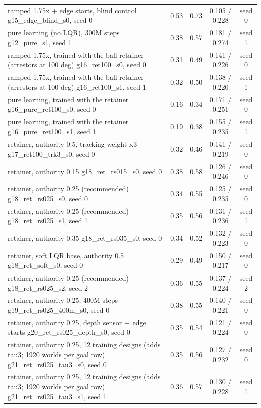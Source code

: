 \begin{table}[t]
{\begin{tabular}{lcccc}
ramped 1.75x + edge starts, blind control g15\_edge\_blind\_s0, seed 0 & 0.53 & 0.73 & 0.105 / 0.228 & seed 0\\
pure learning (no LQR), 300M steps g12\_pure\_s1, seed 1 & 0.38 & 0.57 & 0.181 / 0.274 & seed 1\\
ramped 1.75x, trained with the ball retainer (arrestors at 100 deg) g16\_ret100\_s0, seed 0 & 0.31 & 0.49 & 0.141 / 0.226 & seed 0\\
ramped 1.75x, trained with the ball retainer (arrestors at 100 deg) g16\_ret100\_s1, seed 1 & 0.32 & 0.50 & 0.138 / 0.220 & seed 1\\
pure learning, trained with the retainer g16\_pure\_ret100\_s0, seed 0 & 0.16 & 0.34 & 0.171 / 0.251 & seed 0\\
pure learning, trained with the retainer g16\_pure\_ret100\_s1, seed 1 & 0.19 & 0.38 & 0.155 / 0.235 & seed 1\\
retainer, authority 0.5, tracking weight x3 g17\_ret100\_trk3\_s0, seed 0 & 0.32 & 0.46 & 0.141 / 0.219 & seed 0\\
retainer, authority 0.15 g18\_ret\_rs015\_s0, seed 0 & 0.38 & 0.58 & 0.126 / 0.246 & seed 0\\
retainer, authority 0.25 (recommended) g18\_ret\_rs025\_s0, seed 0 & 0.34 & 0.55 & 0.125 / 0.235 & seed 0\\
retainer, authority 0.25 (recommended) g18\_ret\_rs025\_s1, seed 1 & 0.35 & 0.56 & 0.131 / 0.236 & seed 1\\
retainer, authority 0.35 g18\_ret\_rs035\_s0, seed 0 & 0.34 & 0.52 & 0.132 / 0.223 & seed 0\\
retainer, soft LQR base, authority 0.5 g18\_ret\_soft\_s0, seed 0 & 0.29 & 0.49 & 0.150 / 0.217 & seed 0\\
retainer, authority 0.25 (recommended) g18\_ret\_rs025\_s2, seed 2 & 0.36 & 0.55 & 0.137 / 0.224 & seed 2\\
retainer, authority 0.25, 400M steps g19\_ret\_rs025\_400m\_s0, seed 0 & 0.38 & 0.55 & 0.140 / 0.221 & seed 0\\
retainer, authority 0.25, depth sensor + edge starts g20\_ret\_rs025\_depth\_s0, seed 0 & 0.35 & 0.54 & 0.121 / 0.224 & seed 0\\
retainer, authority 0.25, 12 training designs (adds tau3; 1920 worlds per goal row) g21\_ret\_rs025\_tau3\_s0, seed 0 & 0.35 & 0.56 & 0.127 / 0.232 & seed 0\\
retainer, authority 0.25, 12 training designs (adds tau3; 1920 worlds per goal row) g21\_ret\_rs025\_tau3\_s1, seed 1 & 0.36 & 0.57 & 0.130 / 0.228 & seed 1\\

\end{tabular}}
\end{table}
